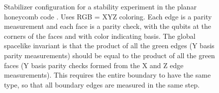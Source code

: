 \documentclass[onecolumn,unpublished,a4paper]{quantumarticle}
\theoremstyle{definition}
\theoremstyle{definition}
\theoremstyle{definition}
\begin{document}
\printbibliography

\clearpage

\begin{figure}
    \centering
    \caption{
        Stabilizer configuration for a stability experiment in the planar honeycomb code \cite{hastings2021dynamically,gidney2021honeycombmemory,haah2021boundaries,gidney2022benchmarking,paetznick2022performance}.
        Uses RGB = XYZ coloring.
        Each edge is a parity measurement and each face is a parity check, with the qubits at the corners of the faces and with color indicating basis.
        The global spacelike invariant is that the product of all the green edges (Y basis parity measurements) should be equal to the product of all the green faces (Y basis parity checks formed from the X and Z edge measurements).
        This requires the entire boundary to have the same type, so that all boundary edges are measured in the same step.
    }
    \label{fig:honeycomb_stability}
\end{figure}
\end{document}
